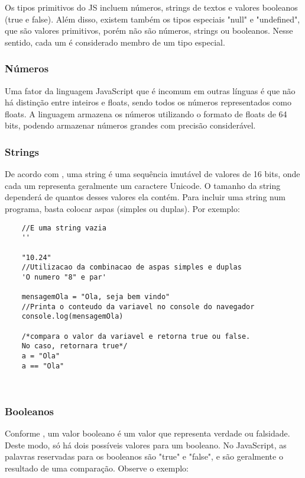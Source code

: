 	Os tipos primitivos do JS incluem números, strings de textos e valores booleanos (true e false).
	Além disso, existem também os tipos especiais "null" e "undefined", que são valores primitivos, porém não são números, strings ou booleanos. Nesse sentido, cada um é considerado membro de um tipo especial.  
	\subsubsection{Números}
	Uma fator da linguagem JavaScript que é incomum em outras línguas é que não há distinção entre inteiros e floats, sendo todos os números representados como floats. 
	A linguagem armazena os números utilizando o formato de floats de 64 bits, podendo armazenar números grandes com precisão considerável.
	
	\subsubsection{Strings}
	De acordo com \cite{flanagan2020javascript}, uma string é uma sequência imutável de valores de 16 bits, onde cada um representa geralmente um caractere Unicode. O tamanho da string dependerá de quantos desses valores ela contém. Para incluir uma string num programa, basta colocar aspas (simples ou duplas). Por exemplo:
	\newline
	
	\begin{lstlisting}
	//E uma string vazia
	''
	
	"10.24"	
	//Utilizacao da combinacao de aspas simples e duplas
	'O numero "8" e par'				
	
	mensagemOla = "Ola, seja bem vindo" 
	//Printa o conteudo da variavel no console do navegador
	console.log(mensagemOla)	
	
	/*compara o valor da variavel e retorna true ou false. 
	No caso, retornara true*/
	a = "Ola"
	a == "Ola"
	
	
	\end{lstlisting}
	
	\subsubsection{Booleanos}
	Conforme \cite{powers2015javascript}, um valor booleano é um valor que representa verdade ou falsidade. Deste modo, só há dois possíveis valores para um booleano. No JavaScript, as palavras reservadas para os booleanos são "true" e "false", e são geralmente o resultado de uma comparação. Observe o exemplo:
	\newline
	
